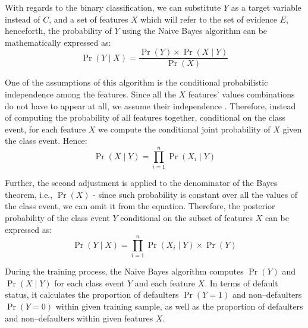 With regards to the binary classification, we can substitute $Y$ as a target variable instead of $C$, and a set of features $X$ which will refer to the set of evidence $E$, henceforth, the probability of $Y$ using the Naive Bayes algorithm can be mathematically expressed as:
\begin{equation}\label{eq}
    \operatorname{Pr}\left(Y \mid X \right) = \frac{\operatorname{Pr}\left(Y\right) \times \operatorname{Pr}\left(X \mid Y \right)}{\operatorname{Pr}\left(X\right)}
\end{equation}

One of the assumptions of this algorithm is the conditional probabilistic independence among the features.
Since all the $X$ features' values combinations do not have to appear at all, we assume their independence \citep{cichosz2014data}.
Therefore, instead of computing the probability of all features together, conditional on the class event, for each feature $X$ we compute the conditional joint probability of $X$ given the class event. Hence:
\begin{equation}\label{eq}
    \operatorname{Pr}\left(X  \mid Y \right) = \prod_{i=1}^{n} \operatorname{Pr}\left(X_i \mid Y\right)
\end{equation}

Further, the second adjustment is applied to the denominator of the Bayes theorem, i.e., $\operatorname{Pr}\left(X\right)$ - since such probability is constant over all the values of the class event, we can omit it from the equation. Therefore, the posterior probability of the class event $Y$ conditional on the subset of features $X$ can be expressed as:
\begin{equation}\label{eq}
    \operatorname{Pr}\left(Y \mid X \right) = \prod_{i=1}^{n} \operatorname{Pr}\left(X_i \mid Y\right) \times \operatorname{Pr}\left(Y\right)
\end{equation}

During the training process, the Naive Bayes algorithm computes $\operatorname{Pr}\left(Y\right)$ and $ \operatorname{Pr}\left(X \mid Y \right)$ for each class event $Y$ and each feature $X$.
In terms of default status, it calculates the proportion of defaulters $\operatorname{Pr}\left(Y = 1\right)$ and non--defaulters $\operatorname{Pr}\left(Y=0\right)$ within given training sample, as well as the proportion of defaulters and non--defaulters within given features $X$.


